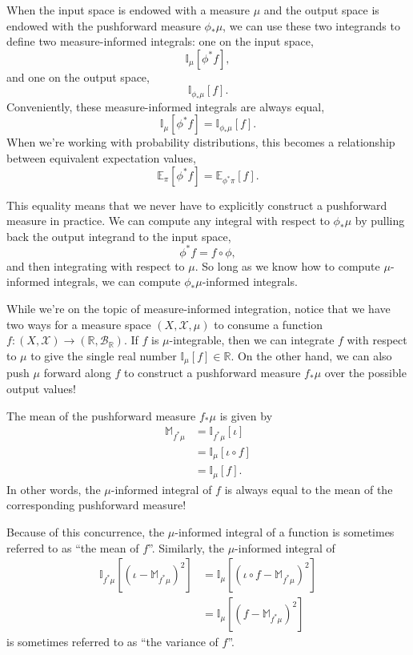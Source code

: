 \documentclass[
  letterpaper,
  DIV=11,
  numbers=noendperiod]{scrartcl}
\begin{document}
When the input space is endowed with a measure \(\mu\) and the output
space is endowed with the pushforward measure \(\phi_{*} \mu\), we can
use these two integrands to define two measure-informed integrals: one
on the input space, \[
\mathbb{I}_{\mu} [ \phi^{*} f ],
\] and one on the output space, \[
\mathbb{I}_{\phi_{*} \mu} [ f ].
\] Conveniently, these measure-informed integrals are always equal, \[
\mathbb{I}_{\mu} [ \phi^{*} f ]
=
\mathbb{I}_{\phi_{*} \mu} [ f ].
\] When we're working with probability distributions, this becomes a
relationship between equivalent expectation values, \[
\mathbb{E}_{\pi} [ \phi^{*} f ]
=
\mathbb{E}_{\phi^{*} \pi} [ f ].
\]

This equality means that we never have to explicitly construct a
pushforward measure in practice. We can compute any integral with
respect to \(\phi_{*} \mu\) by pulling back the output integrand to the
input space, \[
\phi^{*} f = f \circ \phi,
\] and then integrating with respect to \(\mu\). So long as we know how
to compute \(\mu\)-informed integrals, we can compute
\(\phi_{*} \mu\)-informed integrals.

While we're on the topic of measure-informed integration, notice that we
have two ways for a measure space \((X, \mathcal{X}, \mu)\) to consume a
function \(f : (X, \mathcal{X}) \rightarrow
     (\mathbb{R}, \mathcal{B}_{\mathbb{R}})\). If \(f\) is
\(\mu\)-integrable, then we can integrate \(f\) with respect to \(\mu\)
to give the single real number \(\mathbb{I}_{\mu}[f] \in \mathbb{R}\).
On the other hand, we can also push \(\mu\) forward along \(f\) to
construct a pushforward measure \(f_{*} \mu\) over the possible output
values!

The mean of the pushforward measure \(f_{*} \mu\) is given by
\begin{align*}
\mathbb{M}_{f^{*} \mu}
&=
\mathbb{I}_{f^{*} \mu} [ \iota ]
\\
&=
\mathbb{I}_{\mu} [ \iota \circ f ]
\\
&=
\mathbb{I}_{\mu} [ f ].
\end{align*} In other words, the \(\mu\)-informed integral of \(f\) is
always equal to the mean of the corresponding pushforward measure!

Because of this concurrence, the \(\mu\)-informed integral of a function
is sometimes referred to as ``the mean of \(f\)''. Similarly, the
\(\mu\)-informed integral of \begin{align*}
\mathbb{I}_{f^{*} \mu} [ (\iota - \mathbb{M}_{f^{*} \mu})^{2} ]
&=
\mathbb{I}_{\mu} [ (\iota \circ f - \mathbb{M}_{f^{*} \mu})^{2} ]
\\
&=
\mathbb{I}_{\mu} [ (f - \mathbb{M}_{f^{*} \mu})^{2} ]
\end{align*} is sometimes referred to as ``the variance of \(f\)''.
\end{document}
